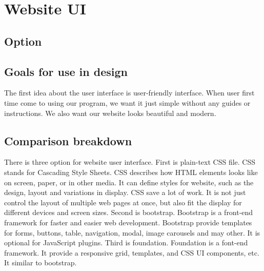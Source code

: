\section{Website UI}

\subsection{Option}

\subsection{Goals for use in design}
The first idea about the user interface is user-friendly interface. When user first time come to using our program, we want it just simple without any guides or instructions. We also want our website looks beautiful and modern. 

\subsection{Comparison breakdown}
There is three option for website user interface.
First is plain-text CSS file. CSS stands for Cascading Style Sheets. CSS describes how HTML elements looks like on screen, paper, or in other media. It can define styles for website, such as the design, layout and variations in display. CSS save a lot of work. It is not just control the layout of multiple web pages at once, but also fit the display for different devices and screen sizes.\cite{CSS_intro}
Second is bootstrap. Bootstrap is a front-end framework for faster and easier web development. Bootstrap provide templates for forms, buttons, table, navigation, modal, image carousels and may other. It is optional for JavaScript plugins. \cite{boot_intro}
Third is foundation. Foundation is a font-end framework. It provide a responsive grid, templates, and CSS UI components, etc. It similar to bootstrap. \cite{foundation_intro}

